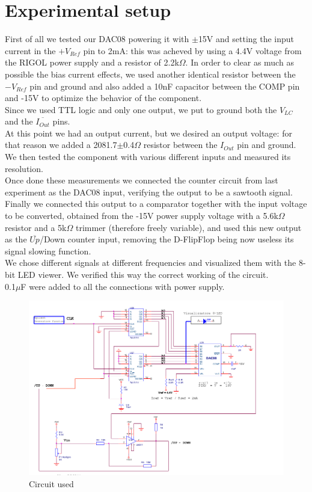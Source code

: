 \section{Experimental setup}
First of all we tested our DAC08 powering it with \(\pm\)15V and setting the input current in the $+V_{Ref}$ pin to 2mA: this was acheved by using a 4.4V voltage from the RIGOL power supply and a resistor of 2.2k\(\Omega\). In order to clear as much as possible the bias current effects, we used another identical resistor between the $-V_{Ref}$ pin and ground and also added a 10nF capacitor between the COMP pin and -15V to optimize the behavior of the component.\\
Since we used TTL logic and only one output, we put to ground both the $V_{LC}$ and the $\overline{I_{Out}}$ pins.\\
At this point we had an output current, but we desired an output voltage: for that reason we added a 2081.7\(\pm\)0.4\(\Omega\) resistor between the $I_{Out}$ pin and ground.\\
We then tested the component with various different inputs and measured its resolution.\\
Once done these measurements we connected the counter circuit from last experiment as the DAC08 input, verifying the output to be a sawtooth signal.\\
Finally we connected this output to a comparator together with the input voltage to be converted, obtained from the -15V power supply voltage with a 5.6k\(\Omega\) resistor and a 5k\(\Omega\) trimmer (therefore freely variable), and used this new output as the $\overline{Up}$/Down counter input, removing the D-FlipFlop being now useless its signal slowing function.\\
We chose different signals at different frequencies and visualized them with the 8-bit LED viewer. We verified this way the correct working of the circuit.\\
0.1\(\mu\)F were added to all the connections with power supply.\\

\begin{figure}[H]
\centering
\includegraphics[width=.8\textwidth]{12/circuit.png}
\caption{Circuit used}
\end{figure}


